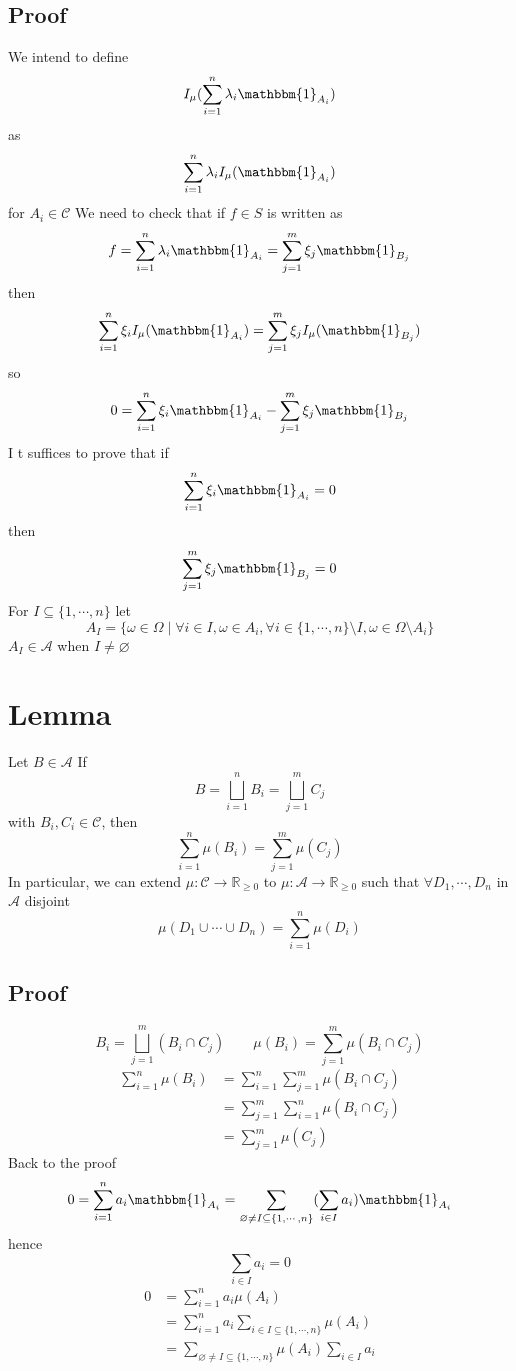 \documentclass{book}
\begin{document}
\subsection*{Proof}
We intend to define$$I_\mu(\sum\limits_{i=1}^n\lambda_i\mathbbm{1}_{A_i})$$ as$$\sum\limits_{i=1}^n\lambda_iI_\mu(\mathbbm{1}_{A_i})$$
for $A_i\in\mathcal{C}$ We need to check that if $f\in S$ is written as 
$$f=\sum\limits_{i=1}^n\lambda_i\mathbbm{1}_{A_i}=\sum\limits_{j=1}^m\xi_{j}\mathbbm{1}_{{B_j}}$$
then $$\sum\limits_{i=1}^n\xi_iI_\mu(\mathbbm{1}_{{A_i}})=\sum\limits_{j=1}^m\xi_jI_\mu(\mathbbm{1}_{{B_j}})$$
so $$0=\sum\limits_{i=1}^n\xi_i\mathbbm{1}_{A_i}-\sum\limits_{j=1}^m\xi_j\mathbbm{1}_{{B_j}}$$I
t suffices to prove that if $$\sum\limits_{i=1}^n\xi_i\mathbbm{1}_{A_i}=0$$
then $$\sum\limits_{j=1}^m\xi_j\mathbbm{1}_{{B_j}}=0$$
For $I\subseteq\{1,\cdots,n\}$ let $$A_I=\{\omega\in\Omega\mid\forall i\in I,\omega\in A_i, \forall i\in \{1,\cdots,n\}\setminus I,\omega\in \Omega\setminus A_i\}$$
$A_I\in \mathcal{A}$ when $I\neq\varnothing$
\section{Lemma}
Let $B\in \mathcal{A}$ If $$B=\bigsqcup\limits_{i=1}^n B_i=\bigsqcup\limits_{j=1}^mC_j$$with 
$B_i,C_i\in \mathcal{C}$, then $$\sum\limits_{i=1}^n\mu(B_i)=\sum\limits_{j=1}^m\mu(C_j)$$
In particular, we can extend $\mu:\mathcal{C}\rightarrow\mathbb{R}_{\geq0}$ to $\mu:\mathcal{A}\rightarrow\mathbb{R}_{\geq0}$ such that $\forall D_1,\cdots,D_n$ in $\mathcal{A}$ disjoint$$\mu(D_1\cup\cdots\cup D_n)=\sum\limits_{i=1}^n\mu(D_i)$$
\subsection{Proof}
$$B_i=\bigsqcup\limits_{j=1}^m(B_i\cap C_j)\qquad\mu(B_i)=\sum\limits_{j=1}^m\mu(B_i\cap C_j)$$
$$\begin{aligned}
    \sum\limits_{i=1}^n\mu(B_i)&=\sum\limits_{i=1}^n\sum\limits_{j=1}^m\mu(B_i\cap C_j)\\
    &=\sum\limits_{j=1}^m\sum\limits_{i=1}^n\mu(B_i\cap C_j)\\
    &=\sum\limits_{j=1}^m\mu(C_j)
\end{aligned}$$
Back to the proof $$0=\sum\limits_{i=1}^n a_i\mathbbm{1}_{A_i}=\sum\limits_{\varnothing\neq I\subseteq\{1,\cdots,n\}}(\sum\limits_{i\in I}a_i)\mathbbm{1}_{A_i}$$
hence $$\sum\limits_{i\in I} a_i=0$$
$$\begin{aligned}
    0 &=\sum\limits_{i=1}^n a_i\mu(A_i)\\
    &=\sum\limits_{i=1}^n a_i\sum\limits_{i\in I\subseteq\{1,\cdots,n\}}\mu(A_i)\\
    &=\sum\limits_{\varnothing\neq I\subseteq\{1,\cdots,n\}}\mu(A_i)\sum\limits_{i\in I}a_i
\end{aligned}$$
\end{document}
